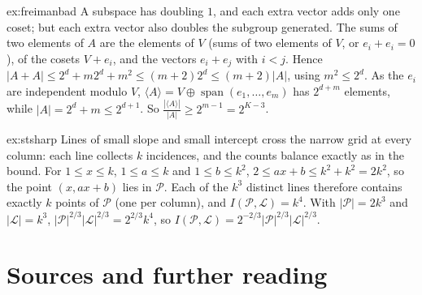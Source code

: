 \begin{solution}{ex:freimanbad}
\idea A subspace has doubling $1$, and each extra vector adds only one coset; but each extra vector also doubles the subgroup generated.
\writeup The sums of two elements of $A$ are the elements of $V$ (sums of two elements of $V$, or $e_i+e_i=0$), of the cosets $V+e_i$, and the vectors $e_i+e_j$ with $i<j$. Hence $|A+A|\le2^d+m2^d+m^2\le(m+2)2^d\le(m+2)|A|$, using $m^2\le2^d$. As the $e_i$ are independent modulo $V$, $\langle A\rangle=V\oplus\operatorname{span}(e_1,\dots,e_m)$ has $2^{d+m}$ elements, while $|A|=2^d+m\le2^{d+1}$. So $\frac{|\langle A\rangle|}{|A|}\ge2^{m-1}=2^{K-3}$.
\end{solution}

\begin{solution}{ex:stsharp}
\idea Lines of small slope and small intercept cross the narrow grid at every column: each line collects $k$ incidences, and the counts balance exactly as in the bound.
\writeup For $1\le x\le k$, $1\le a\le k$ and $1\le b\le k^2$, $2\le ax+b\le k^2+k^2=2k^2$, so the point $(x,ax+b)$ lies in $\mathcal P$. Each of the $k^3$ distinct lines therefore contains exactly $k$ points of $\mathcal P$ (one per column), and $I(\mathcal P,\mathcal L)=k^4$. With $|\mathcal P|=2k^3$ and $|\mathcal L|=k^3$, $|\mathcal P|^{2/3}|\mathcal L|^{2/3}=2^{2/3}k^4$, so $I(\mathcal P,\mathcal L)=2^{-2/3}|\mathcal P|^{2/3}|\mathcal L|^{2/3}$.
\end{solution}

\section*{Sources and further reading}

